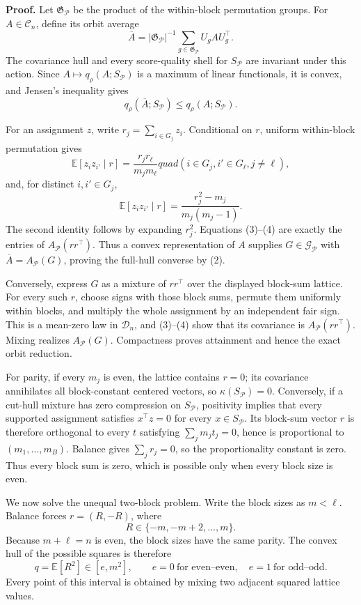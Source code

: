 \textbf{Proof.}
Let \(\mathfrak G_{\mathcal P}\) be the product of the within-block permutation groups.  For \(A\in\mathcal C_n\), define its orbit average
\[
\overline A=|\mathfrak G_{\mathcal P}|^{-1}
\sum_{g\in\mathfrak G_{\mathcal P}}U_gAU_g^\top.
\tag{1}
\]
The covariance hull and every score-quality shell for \(S_{\mathcal P}\) are invariant under this action.  Since \(A\mapsto q_\rho(A;S_{\mathcal P})\) is a maximum of linear functionals, it is convex, and Jensen's inequality gives
\[
q_\rho(\overline A;S_{\mathcal P})\leq q_\rho(A;S_{\mathcal P}).
\tag{2}
\]

For an assignment \(z\), write \(r_j=\sum_{i\in G_j}z_i\).  Conditional on \(r\), uniform within-block permutation gives
\[
\mathbb E[z_i z_{i'}\mid r]=\frac{r_jr_\ell}{m_jm_\ell}quad
(i\in G_j,i'\in G_\ell,j\ne\ell),
\tag{3}
\]
and, for distinct \(i,i'\in G_j\),
\[
\mathbb E[z_i z_{i'}\mid r]
=\frac{r_j^2-m_j}{m_j(m_j-1)}.
\tag{4}
\]
The second identity follows by expanding \(r_j^2\).  Equations (3)--(4) are exactly the entries of \(A_{\mathcal P}(rr^\top)\).  Thus a convex representation of \(A\) supplies \(G\in\mathcal G_{\mathcal P}\) with \(\overline A=A_{\mathcal P}(G)\), proving the full-hull converse by (2).

Conversely, express \(G\) as a mixture of \(rr^\top\) over the displayed block-sum lattice.  For every such \(r\), choose signs with those block sums, permute them uniformly within blocks, and multiply the whole assignment by an independent fair sign.  This is a mean-zero law in \(\mathcal D_n\), and (3)--(4) show that its covariance is \(A_{\mathcal P}(rr^\top)\).  Mixing realizes \(A_{\mathcal P}(G)\).  Compactness proves attainment and hence the exact orbit reduction.

For parity, if every \(m_j\) is even, the lattice contains \(r=0\); its covariance annihilates all block-constant centered vectors, so \(\kappa(S_{\mathcal P})=0\).  Conversely, if a cut-hull mixture has zero compression on \(S_{\mathcal P}\), positivity implies that every supported assignment satisfies \(x^\top z=0\) for every \(x\in S_{\mathcal P}\).  Its block-sum vector \(r\) is therefore orthogonal to every \(t\) satisfying \(\sum_jm_jt_j=0\), hence is proportional to \((m_1,\ldots,m_B)\).  Balance gives \(\sum_jr_j=0\), so the proportionality constant is zero.  Thus every block sum is zero, which is possible only when every block size is even.

We now solve the unequal two-block problem.  Write the block sizes as \(m<\ell\).  Balance forces \(r=(R,-R)\), where
\[
R\in\{-m,-m+2,\ldots,m\}.
\]
Because \(m+\ell=n\) is even, the block sizes have the same parity.  The convex hull of the possible squares is therefore
\[
q=\mathbb E[R^2]\in[e,m^2],
\qquad e=0\ \text{for even--even},\quad e=1\ \text{for odd--odd}.
\tag{5}
\]
Every point of this interval is obtained by mixing two adjacent squared lattice values.

